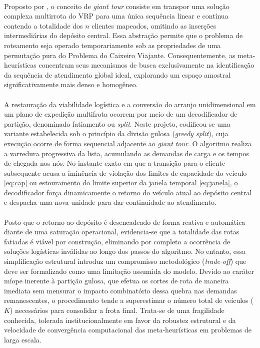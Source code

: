 \paragraph{} Proposto por \cite{prins2004simple}, o conceito de \textit{giant tour} consiste em transpor uma solução complexa multirrota do VRP para uma única sequência linear e contínua contendo a totalidade dos $n$ clientes mapeados, omitindo as inserções intermediárias do depósito central. Essa abstração permite que o problema de roteamento seja operado temporariamente sob as propriedades de uma permutação pura do Problema do Caixeiro Viajante. Consequentemente, as meta-heurísticas concentram seus mecanismos de busca exclusivamente na identificação da sequência de atendimento global ideal, explorando um espaço amostral significativamente mais denso e homogêneo.

\paragraph{} A restauração da viabilidade logística e a conversão do arranjo unidimensional em um plano de expedição multifrota ocorrem por meio de um decodificador de partição, denominado fatiamento ou \textit{split}. Neste projeto, codificou-se uma variante estabelecida sob o princípio da divisão gulosa (\textit{greedy split}), cuja execução ocorre de forma sequencial adjacente ao \textit{giant tour}. O algoritmo realiza a varredura progressiva da lista, acumulando as demandas de carga e os tempos de chegada nos nós. No instante exato em que a transição para o cliente subsequente acusa a iminência de violação dos limites de capacidade do veículo \eqref{eq:cap} ou estouramento do limite superior da janela temporal \eqref{eq:janela}, o decodificador força dinamicamente o retorno do veículo atual ao depósito central e despacha uma nova unidade para dar continuidade ao atendimento.

\paragraph{} Posto que o retorno ao depósito é desencadeado de forma reativa e automática diante de uma saturação operacional, evidencia-se que a totalidade das rotas fatiadas é viável por construção, eliminando por completo a ocorrência de soluções logísticas inválidas ao longo dos passos do algoritmo. No entanto, essa simplificação estrutural introduz um compromisso metodológico (\textit{trade-off}) que deve ser formalizado como uma limitação assumida do modelo. Devido ao caráter míope inerente à partição gulosa, que efetua os cortes de rota de maneira imediata sem mensurar o impacto combinatório dessa quebra nas demandas remanescentes, o procedimento tende a superestimar o número total de veículos ($K$) necessários para consolidar a frota final. Trata-se de uma fragilidade conhecida, tolerada institucionalmente em favor da robustez estrutural e da velocidade de convergência computacional das meta-heurísticas em problemas de larga escala.

